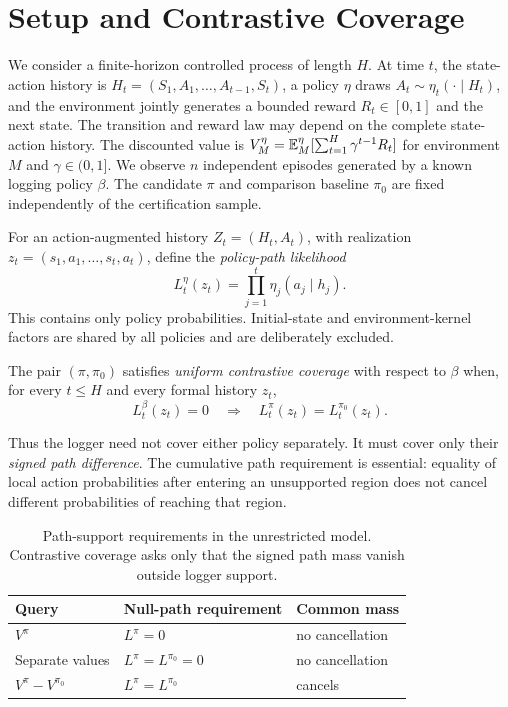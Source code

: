 \section{Setup and Contrastive Coverage}

We consider a finite-horizon controlled process of length $H$. At time $t$, the state-action history is
$H_t=(S_1,A_1,\ldots,A_{t-1},S_t)$, a policy $\eta$ draws $A_t\sim\eta_t(\cdot\mid H_t)$, and the environment jointly generates a bounded reward $R_t\in[0,1]$ and the next state. The transition and reward law may depend on the complete state-action history. The discounted value is
$V_M^\eta=\mathbb{E}_M^\eta[\sum_{t=1}^H\gamma^{t-1}R_t]$ for environment $M$ and $\gamma\in(0,1]$. We observe $n$ independent episodes generated by a known logging policy $\beta$. The candidate $\pi$ and comparison baseline $\pi_0$ are fixed independently of the certification sample.

For an action-augmented history $Z_t=(H_t,A_t)$, with realization
$z_t=(s_1,a_1,\ldots,s_t,a_t)$, define the \emph{policy-path likelihood}
\begin{equation}
L_t^\eta(z_t)=\prod_{j=1}^t\eta_j(a_j\mid h_j).
\label{eq:pathlik}
\end{equation}
This contains only policy probabilities. Initial-state and environment-kernel factors are shared by all policies and are deliberately excluded.

\begin{definition}
The pair $(\pi,\pi_0)$ satisfies \emph{uniform contrastive coverage} with respect to $\beta$ when, for every $t\le H$ and every formal history $z_t$,
\begin{equation}
L_t^\beta(z_t)=0
\quad\Longrightarrow\quad
L_t^\pi(z_t)=L_t^{\pi_0}(z_t).
\label{eq:ucc}
\end{equation}
\end{definition}

Thus the logger need not cover either policy separately. It must cover only their \emph{signed path difference}. The cumulative path requirement is essential: equality of local action probabilities after entering an unsupported region does not cancel different probabilities of reaching that region.

\begin{table}[t]
\centering
\footnotesize
\setlength{\tabcolsep}{3pt}
\begin{tabular}{@{}lll@{}}
\toprule
Query & Null-path requirement & Common mass \\
\midrule
$V^\pi$ & $L^\pi=0$ & no cancellation \\
Separate values & $L^\pi=L^{\pi_0}=0$ & no cancellation \\
$V^\pi-V^{\pi_0}$ & $L^\pi=L^{\pi_0}$ & cancels \\
\bottomrule
\end{tabular}
\caption{Path-support requirements in the unrestricted model. Contrastive coverage asks only that the signed path mass vanish outside logger support.}
\label{tab:coverage}
\end{table}

